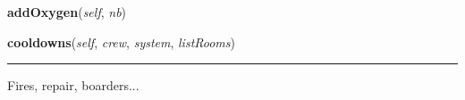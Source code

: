     \label{room:Room:addOxygen}

    \vspace{0.5ex}

\hspace{.8\funcindent}\begin{boxedminipage}{\funcwidth}

    \raggedright \textbf{addOxygen}(\textit{self}, \textit{nb})

\setlength{\parskip}{2ex}
\setlength{\parskip}{1ex}
    \end{boxedminipage}

    \label{room:Room:cooldowns}

    \vspace{0.5ex}

\hspace{.8\funcindent}\begin{boxedminipage}{\funcwidth}

    \raggedright \textbf{cooldowns}(\textit{self}, \textit{crew}, \textit{system}, \textit{listRooms})

    \vspace{-1.5ex}

    \rule{\textwidth}{0.5\fboxrule}
\setlength{\parskip}{2ex}
    Fires, repair, boarders...

\setlength{\parskip}{1ex}
    \end{boxedminipage}

    \label{room:Room:crewTasks}

    \vspace{0.5ex}

